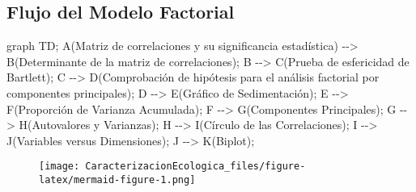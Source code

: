 \documentclass[
  10pt,
  letterpaper,
  DIV=11,
  numbers=noendperiod]{scrreprt}
\newenvironment{Shaded}{\begin{snugshade}}{\end{snugshade}}
\newcommand{\NormalTok}[1]{\textcolor[rgb]{0.00,0.23,0.31}{#1}}
\begin{document}
\hypertarget{flujo-del-modelo-factorial}{%
\subsection{Flujo del Modelo
Factorial}\label{flujo-del-modelo-factorial}}

\begin{Shaded}
\begin{Highlighting}[numbers=left,,]
\NormalTok{graph TD;}
\NormalTok{    A(Matriz de correlaciones y su significancia estadística) {-}{-}\textgreater{} }
\NormalTok{    B(Determinante de la matriz de correlaciones);}
\NormalTok{    B {-}{-}\textgreater{} C(Prueba de esfericidad de Bartlett);}
\NormalTok{    C {-}{-}\textgreater{} D(Comprobación de hipótesis para el análisis factorial por componentes principales);}
\NormalTok{    D {-}{-}\textgreater{} E(Gráfico de Sedimentación);}
\NormalTok{    E {-}{-}\textgreater{} F(Proporción de Varianza Acumulada);}
\NormalTok{    F {-}{-}\textgreater{} G(Componentes Principales);}
\NormalTok{    G {-}{-}\textgreater{} H(Autovalores y Varianzas);}
\NormalTok{    H {-}{-}\textgreater{} I(Círculo de las Correlaciones);}
\NormalTok{    I {-}{-}\textgreater{} J(Variables versus Dimensiones);}
\NormalTok{    J {-}{-}\textgreater{} K(Biplot);}
\end{Highlighting}
\end{Shaded}

\begin{figure}[H]

{\centering \texttt{[image: CaracterizacionEcologica\_files/figure-latex/mermaid-figure-1.png]}

}

\end{figure}


\printbibliography[title=Bibliografía]
\end{document}
